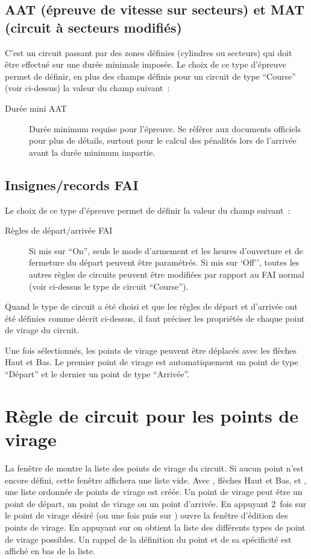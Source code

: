 \subsection*{AAT (épreuve de vitesse sur secteurs) et MAT (circuit à secteurs modifiés)}
C'est un circuit passant par des zones définies (cylindres ou secteurs) qui doit être effectué sur une durée minimale imposée.
Le choix de ce type d'épreuve permet de définir, en plus des champs définis pour un circuit de type ``Course'' (voir ci-dessus) la valeur du champ suivant~:
  \begin{description}
  \item [Durée mini AAT] Durée minimum requise pour l'épreuve.
  Se référer aux documents officiels pour plus de détails, surtout pour le calcul des pénalités lors de l'arrivée avant la durée minimum impartie.
 \end{description}

\subsection*{Insignes/records FAI}
Le choix de ce type d'épreuve permet de définir la valeur du champ suivant~: 
  \begin{description}
  \item [Règles de départ/arrivée FAI] Si mis sur ``On'', seuls le mode d'armement et les heures d'ouverture et de fermeture du départ peuvent être paramétrés.
Si mis sur `Off'', toutes les autres règles de circuits peuvent être modifiées par rapport au FAI normal (voir ci-dessus le type de circuit ``Course''). 
  \end{description}

Quand le type de circuit a été choisi et que les règles de départ et d'arrivée
ont été définies comme décrit ci-dessus, il faut préciser les propriétés
de chaque point de virage du circuit.

Une fois sélectionnés, les points de virage peuvent être déplacés avec les flèches Haut et Bas.
Le premier point de virage est automatiquement un point de type ``Départ'' et le dernier un point de type ``Arrivée''.

\section{Règle de circuit pour les points de virage}\label{sec:task-rules}

La fenêtre de  montre la liste des points de virage du circuit.
 Si aucun point n'est encore défini, cette fenêtre
affichera une liste vide. Avec , flèches Haut et Bas, et
, une liste ordonnée de points de virage est créée.
Un point de virage peut être un point de départ, un point de virage ou un point d'arrivée.
En appuyant 2~fois sur le point de virage désiré (ou une fois puis sur ) ouvre la fenêtre d'édition des points de virage.
En appuyant sur  on obtient la liste des différents types de point de virage possibles.
Un rappel de la définition du point et de sa spécificité est affiché en bas de la liste.

